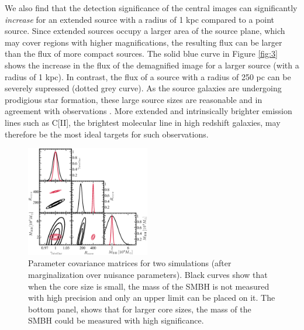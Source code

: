 \documentclass[chicago]{emulateapj}
\begin{document}
We also find that the detection significance of the central images can significantly \emph{increase} for an extended source with a radius of 1 kpc compared to a point source. Since extended sources occupy a larger area of the source plane, which may cover regions with higher magnifications, the resulting flux can be larger than the flux of more compact sources. The solid blue curve in Figure \ref{fig:3} shows the increase in the flux of the demagnified image for a larger source (with a radius of 1 kpc). In contrast, the flux of a source with a radius of 250 pc can be severely supressed (dotted grey curve). 
As the source galaxies are undergoing prodigious star formation, these large source sizes are reasonable and in agreement with observations \citep{hezaveh:13b}.
More extended and intrinsically brighter emission lines such as C[II], the brightest molecular line in high redshift galaxies, may therefore be the most ideal targets for such observations.

\begin{figure}
\begin{center}
\centering
\includegraphics[trim= 2 5 0 0, clip, width=0.48\textwidth]{figures/f_04.eps}
\centering
\end{center}
\caption{ Parameter covariance matrices for two simulations (after marginalization over nuisance parameters). Black curves show that when the core size is small, the mass of the SMBH is not measured with high precision and only an upper limit can be placed on it. The bottom panel, shows that for larger core sizes, the mass of the SMBH could be measured with high significance. 
\label{fig:4}}
\end{figure}
\end{document}
